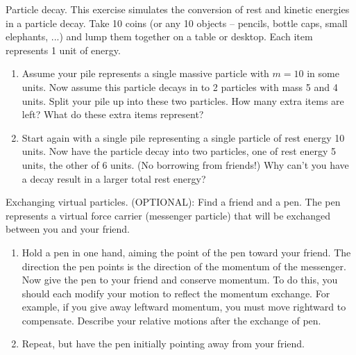 \begin{aproblem}{Particle decay.}  
  This exercise simulates the conversion of rest and kinetic energies
  in a particle decay. Take 10 coins (or any 10 objects -- pencils,
  bottle caps, small elephants, ...) and lump them together on a table
  or desktop. Each item represents 1 unit of energy.

  \begin{enumerate}
  \item Assume your pile represents a single massive particle with $m
    = 10$ in some units.  Now assume this particle decays in to 2
    particles with mass 5 and 4 units.  Split your pile up into these
    two particles.  How many extra items are left?  What do these
    extra items represent?

  \item Start again with a single pile representing a single particle
    of rest energy 10 units.  Now have the particle decay into two
    particles, one of rest energy 5 units, the other of 6 units.  (No
    borrowing from friends!)  Why can't you have a decay result in a
    larger total rest energy?

  \end{enumerate}
\end{aproblem}


\begin{aproblem}{Exchanging virtual particles.} 
  (OPTIONAL): Find a friend and a pen.  The pen represents a virtual
  force carrier (messenger particle) that will be exchanged between
  you and your friend.

  \begin{enumerate}
  \item Hold a pen in one hand, aiming the point of the pen toward
    your friend.  The direction the pen points is the direction of the
    momentum of the messenger.  Now give the pen to your friend and
    conserve momentum.  To do this, you should each modify your motion
    to reflect the momentum exchange.  For example, if you give away
    leftward momentum, you must move rightward to compensate. Describe
    your relative motions after the exchange of pen.

  \item Repeat, but have the pen initially pointing away from your
    friend.

  \end{enumerate}
\end{aproblem}


